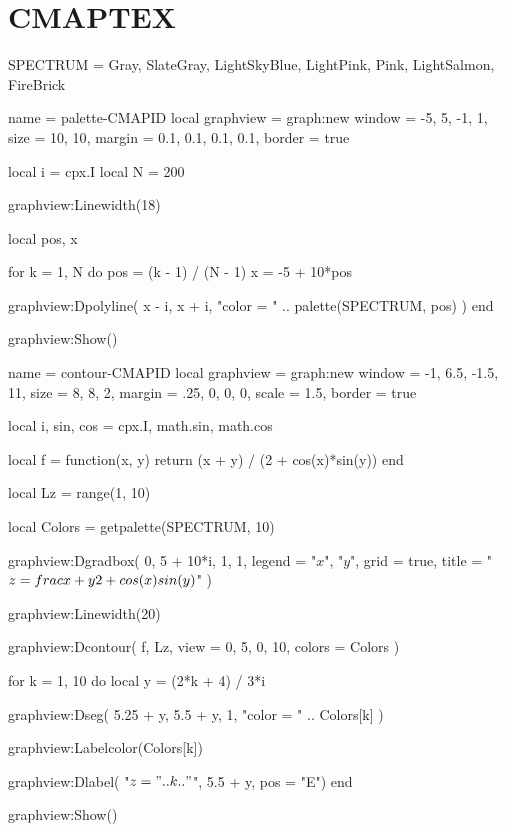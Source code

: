\documentclass{article}
\begin{document}
\centering

\section*{CMAPTEX}

\begin{luacode*}
SPECTRUM = {Gray, SlateGray, LightSkyBlue, LightPink, Pink, LightSalmon, FireBrick}
\end{luacode*}

\begin{luadraw}{name = palette-CMAPID}
local graphview = graph:new{
  window = {-5, 5, -1, 1},
  size   = {10, 10},
  margin = {0.1, 0.1, 0.1, 0.1},
  border = true
}

local i = cpx.I
local N = 200

graphview:Linewidth(18)

local pos, x

for k = 1, N do
  pos = (k - 1) / (N - 1)
  x   = -5 + 10*pos

  graphview:Dpolyline(
    {x - i, x + i},
    "color = " .. palette(SPECTRUM, pos)
  )
end

graphview:Show()
\end{luadraw}

\bigskip
\bigskip
\medskip

\begin{luadraw}{name = contour-CMAPID}
local graphview = graph:new{
  window = {-1, 6.5, -1.5, 11},
  size   = {8, 8, 2},
  margin = {.25, 0, 0, 0},
  scale  = 1.5,
  border = true
}

local i, sin, cos = cpx.I, math.sin, math.cos

local f = function(x, y) return (x + y) / (2 + cos(x)*sin(y)) end

local Lz = range(1, 10)

local Colors = getpalette(SPECTRUM, 10)

graphview:Dgradbox(
  {0, 5 + 10*i, 1, 1},
  {
    legend = {"$x$", "$y$"},
    grid   = true,
    title  = "$z = \\frac{x + y}{2 + \\cos(x) \\sin(y)}$"
  })

graphview:Linewidth(20)

graphview:Dcontour(
  f,
  Lz,
  {
    view   = {0, 5, 0, 10},
    colors = Colors
  })

for k = 1, 10 do
  local y = (2*k + 4) / 3*i

  graphview:Dseg(
    {5.25 + y, 5.5 + y},
    1,
    "color = " .. Colors[k]
  )

  graphview:Labelcolor(Colors[k])

  graphview:Dlabel(
    "$z = " .. k .. "$",
    5.5 + y,
    {pos = "E"})
end

graphview:Show()
\end{luadraw}
\end{document}
